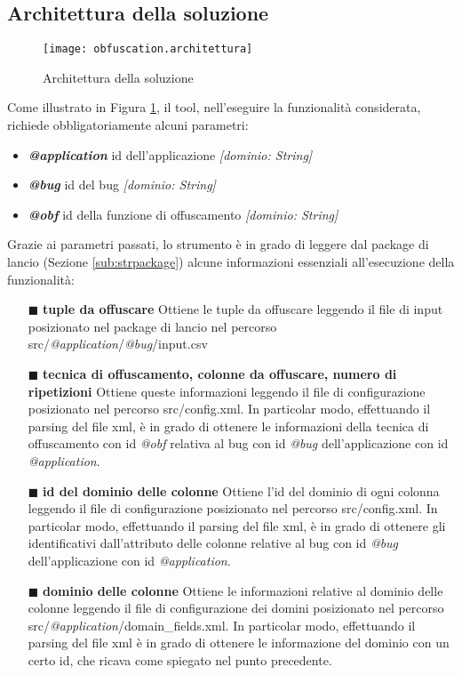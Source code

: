 \subsection*{Architettura della soluzione}
\begin{figure}[H]
	\texttt{[image: obfuscation.architettura]}
	\centering
	\caption{Architettura della soluzione}%
    \label{fig:obfarch}
\end{figure}
Come illustrato in Figura \ref{fig:obfarch}, il tool, nell'eseguire la funzionalità considerata, richiede obbligatoriamente alcuni parametri:
\begin{itemize} [nosep]
\item \textbf{\emph{@application}} id dell'applicazione \emph{[dominio: String]}
\item \textbf{\emph{@bug}} id del bug \emph{[dominio: String]}
\item \textbf{\emph{@obf}} id della funzione di offuscamento \emph{[dominio: String]}
\end{itemize}
\bigskip
\noindent Grazie ai parametri passati, lo strumento è in grado di leggere dal package di lancio (Sezione \ref{sub:strpackage}) alcune informazioni essenziali all'esecuzione della funzionalità:
\begin{itemize} [nosep]
\item [$\blacksquare$]\textbf{tuple da offuscare} \newline
Ottiene le tuple da offuscare leggendo il file di input posizionato nel package di lancio nel percorso src/\emph{@application}/\emph{@bug}/input.csv

\item  [$\blacksquare$] \textbf{tecnica di offuscamento, colonne da offuscare, numero di ripetizioni} \newline
Ottiene queste informazioni leggendo il file di configurazione posizionato nel percorso src/config.xml. In particolar modo, effettuando il parsing del file xml, è in grado di ottenere le informazioni della tecnica di offuscamento con id \emph{@obf} relativa al bug con id \emph{@bug} dell'applicazione con id \emph{@application}.

\item  [$\blacksquare$]\textbf{id del dominio delle colonne} \newline
Ottiene l'id del dominio di ogni colonna leggendo il file di configurazione posizionato nel percorso src/config.xml. In particolar modo, effettuando il parsing del file xml, è in grado di ottenere gli identificativi dall'attributo delle colonne relative al bug con id \emph{@bug} dell'applicazione con id \emph{@application}.

\item  [$\blacksquare$]\textbf{dominio delle colonne} \newline
Ottiene le informazioni relative al dominio delle colonne leggendo il file di configurazione dei domini posizionato nel percorso src/\emph{@application}/domain\_fields.xml. In particolar modo, effettuando il parsing del file xml è in grado di ottenere le informazione del dominio con un certo id, che ricava come spiegato nel punto precedente.
\end{itemize}
